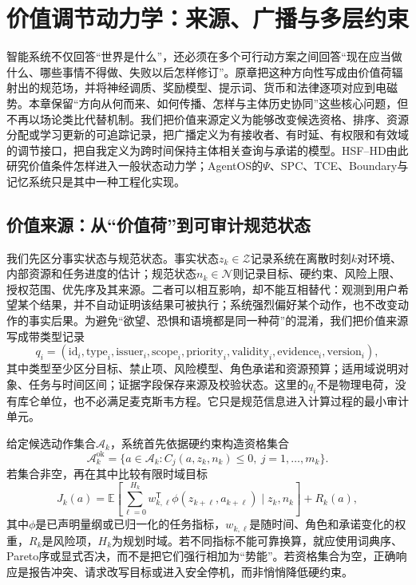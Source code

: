 \chapter{价值调节动力学：来源、广播与多层约束}
\label{chp:physics_of_gauge_source}

智能系统不仅回答“世界是什么”，还必须在多个可行动方案之间回答“现在应当做什么、哪些事情不得做、失败以后怎样修订”。原章把这种方向性写成由价值荷辐射出的规范场，并将神经调质、奖励模型、提示词、货币和法律逐项对应到电磁势。本章保留“方向从何而来、如何传播、怎样与主体历史协同”这些核心问题，但不再以场论类比代替机制。我们把价值来源定义为能够改变候选资格、排序、资源分配或学习更新的可追踪记录，把广播定义为有接收者、有时延、有权限和有效域的调节接口，把自我定义为跨时间保持主体相关查询与承诺的模型。HSF--HD由此研究价值条件怎样进入一般状态动力学；AgentOS的$\Psi$、SPC、TCE、Boundary与记忆系统只是其中一种工程化实现。

\section{价值来源：从“价值荷”到可审计规范状态}
\label{sec:cognitive_charge}

我们先区分事实状态与规范状态。事实状态$z_k\in\mathcal Z$记录系统在离散时刻$k$对环境、内部资源和任务进度的估计；规范状态$n_k\in\mathcal N$则记录目标、硬约束、风险上限、授权范围、优先序及其来源。二者可以相互影响，却不能互相替代：观测到用户希望某个结果，并不自动证明该结果可被执行；系统强烈偏好某个动作，也不改变动作的事实后果。为避免“欲望、恐惧和语境都是同一种荷”的混淆，我们把价值来源写成带类型记录
\[
q_i=(\mathrm{id}_i,\mathrm{type}_i,\mathrm{issuer}_i,\mathrm{scope}_i,
\mathrm{priority}_i,\mathrm{validity}_i,\mathrm{evidence}_i,\mathrm{version}_i),
\]
其中类型至少区分目标、禁止项、风险模型、角色承诺和资源预算；适用域说明对象、任务与时间区间；证据字段保存来源及校验状态。这里的$q_i$不是物理电荷，没有库仑单位，也不必满足麦克斯韦方程。它只是规范信息进入计算过程的最小审计单元。

给定候选动作集合$\mathcal A_k$，系统首先依据硬约束构造资格集合
\[
\mathcal A_k^{\mathrm{ok}}=\{a\in\mathcal A_k:C_j(a,z_k,n_k)\le 0,\ j=1,\ldots,m_k\}.
\]
若集合非空，再在其中比较有限时域目标
\[
J_k(a)=\mathbb E\!\left[\sum_{\ell=0}^{H_k}w_{k,\ell}^{\mathsf T}
\phi(z_{k+\ell},a_{k+\ell})\mid z_k,n_k\right]+R_k(a),
\]
其中$\phi$是已声明量纲或已归一化的任务指标，$w_{k,\ell}$是随时间、角色和承诺变化的权重，$R_k$是风险项，$H_k$为规划时域。若不同指标不能可靠换算，就应使用词典序、Pareto序或显式否决，而不是把它们强行相加为“势能”。若资格集合为空，正确响应是报告冲突、请求改写目标或进入安全停机，而非悄悄降低硬约束。

